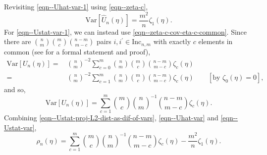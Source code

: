\documentclass[12pt]{article}
\numberwithin{equation}{section}
\theoremstyle{definition}
\theoremstyle{plain}
\begin{document}
Revisiting \eqref{eqn--Uhat-var-1} using \eqref{eqn--zeta-c},
\begin{equation}
  \mathrm{Var} \left[ \widehat{U}_{n} (\eta) \right] = \frac{m^{2}}{n} \zeta_{1}
  (\eta).
  \label{eqn--Uhat-var}
\end{equation}
For \eqref{eqn--Ustat-var-1}, we can instead use
\eqref{eqn--zeta-c-cov-eta-c-common}.
Since there are \(\binom{n}{m} \binom{m}{c} \binom{n - m}{m - c}\) pairs \(i,
i^{\prime} \in \mathrm{Inc}_{n, m}\) with exactly \(c\) elements in common (see
 for a formal statement and proof),
\begin{align*}
  \mathrm{Var} \left[ U_{n} (\eta) \right] =
    & \, \binom{n}{m}^{- 2} \sum_{c = 0}^{m} \binom{n}{m} \binom{m}{c} \binom{n
    - m}{m - c} \zeta_{c} (\eta) \\
    =
    & \, \binom{n}{m}^{- 2} \sum_{c = 1}^{m} \binom{n}{m} \binom{m}{c} \binom{n
    - m}{m - c} \zeta_{c} (\eta) \qquad [\text{by } \zeta_{0} (\eta) = 0],
\end{align*}
and so,
\begin{equation}
  \mathrm{Var} \left[ U_{n} (\eta) \right] = \sum_{c = 1}^{m} \binom{m}{c}
  \binom{n}{m}^{- 1} \binom{n - m}{m - c} \zeta_{c} (\eta).
  \label{eqn--Ustat-var}
\end{equation}
Combining \eqref{eqn--Ustat-proj-L2-dist-as-dif-of-vars}, \eqref{eqn--Uhat-var}
and \eqref{eqn--Ustat-var},
\begin{equation}
  \rho_{n} (\eta) = \sum_{c = 1}^{m} \binom{m}{c} \binom{n}{m}^{- 1} \binom{n
  - m}{m - c} \zeta_{c} (\eta) - \frac{m^{2}}{n} \zeta_{1} (\eta).
  \label{eqn--L2-dist-proj-as-comb-sum}
\end{equation}
\end{document}
